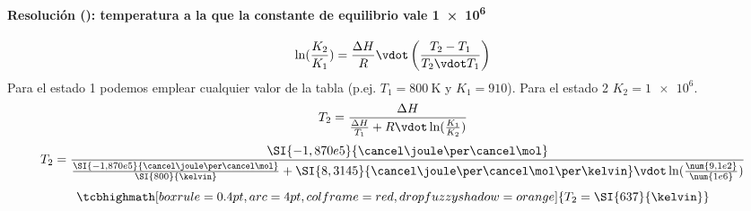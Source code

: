 \begin{frame}
	\frametitle{\ejerciciocmd}
	\framesubtitle{Resolución (): temperatura a la que la constante de equilibrio vale \num{1e6}}
	$$
		\ln(\frac{K_2}{K_1}) = \frac{\Delta H}{R}\vdot\left(\frac{T_2 - T_1}{T_2\vdot T_1}\right)
	$$
	Para el estado \num{1} podemos emplear cualquier valor de la tabla (p.ej. $T_1 = \SI{800}{\kelvin}$ y $K_1 = \num{910}$). Para el estado \num{2} $K_2 = \num{1e6}$.\\[.2cm]
	$$
		T_2 = \frac{\Delta H}{\frac{\Delta H}{T_1} + R\vdot\ln(\frac{K_1}{K_2})}
	$$
	$$
		T_2 = \frac{\SI{-1,870e5}{\cancel\joule\per\cancel\mol}}{\frac{\SI{-1,870e5}{\cancel\joule\per\cancel\mol}}{\SI{800}{\kelvin}} + \SI{8,3145}{\cancel\joule\per\cancel\mol\per\kelvin}\vdot\ln(\frac{\num{9,1e2}}{\num{1e6}})}
	$$
	$$
		\tcbhighmath[boxrule=0.4pt,arc=4pt,colframe=red,drop fuzzy shadow=orange]{T_2 = \SI{637}{\kelvin}}
	$$
\end{frame}
